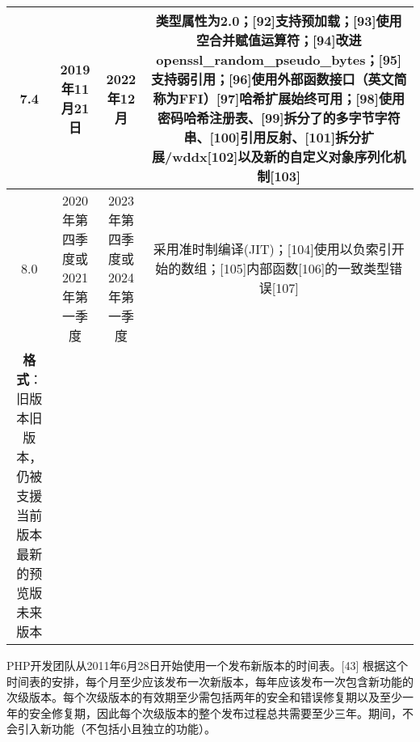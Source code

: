 \begin{table}[ht]
\begin{tabular}{|c|c|c|c}
\hline
7.4 & 2019年11月21日 & 2022年12月 & 类型属性为2.0；[92]支持预加载；[93]使用空合并赋值运算符；[94]改进openssl_random_pseudo_bytes；[95]支持弱引用；[96]使用外部函数接口（英文简称为FFI）[97]哈希扩展始终可用；[98]使用密码哈希注册表、[99]拆分了的多字节字符串、[100]引用反射、[101]拆分扩展/wddx[102]以及新的自定义对象序列化机制[103]\\
\hline
8.0 & 2020年第四季度或2021年第一季度 & 2023年第四季度或2024年第一季度 & 采用准时制编译(JIT)；[104]使用以负索引开始的数组；[105]内部函数[106]的一致类型错误[107]\\
\hline
\textbf{格式}：旧版本旧版本，仍被支援当前版本最新的预览版未来版本 &  &  & \\
\hline
\end{tabular}
\end{table}
PHP开发团队从2011年6月28日开始使用一个发布新版本的时间表。[43] 根据这个时间表的安排，每个月至少应该发布一次新版本，每年应该发布一次包含新功能的次级版本。每个次级版本的有效期至少需包括两年的安全和错误修复期以及至少一年的安全修复期，因此每个次级版本的整个发布过程总共需要至少三年。期间，不会引入新功能（不包括小且独立的功能）。
